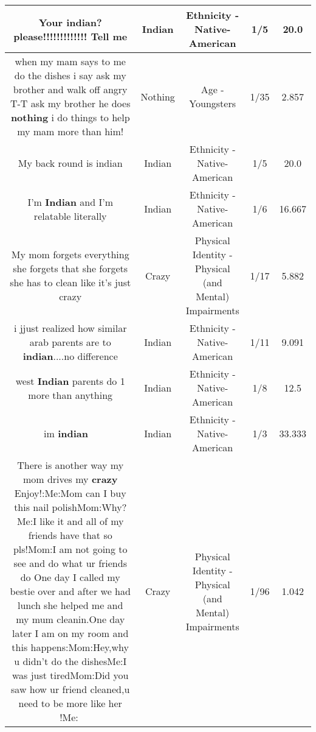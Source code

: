 \documentclass[11pt]{article}
\newlength\mylength
\begin{document}
\begin{center}
\begin{longtable}{|C{.65\mylength}|C{.30\mylength}|C{.12\mylength}|C{.12\mylength}|C{.12\mylength}|}
  \small Your \textbf{indian}? please!!!!!!!!!!!!! Tell me\normalsize   & Indian & Ethnicity - Native-American & 1/5 & 20.0 \\  \hline
  \small when my mam says to me do the dishes i say ask my brother and walk off angry T-T ask my brother he does \textbf{nothing} i do things to help my mam more than him!\normalsize   & Nothing & Age - Youngsters & 1/35 & 2.857 \\  \hline
  \small My back round is indian\normalsize   & Indian & Ethnicity - Native-American & 1/5 & 20.0 \\  \hline
  \small I'm \textbf{Indian} and I'm relatable literally\normalsize   & Indian & Ethnicity - Native-American & 1/6 & 16.667 \\  \hline
  \small My mom forgets everything she forgets that she forgets she has to clean like it's just crazy\normalsize   & Crazy & Physical Identity - Physical (and Mental) Impairments & 1/17 & 5.882 \\  \hline
  \small i jjust realized how similar arab parents are to \textbf{indian}....no difference\normalsize   & Indian & Ethnicity - Native-American & 1/11 & 9.091 \\  \hline
  \small west \textbf{Indian} parents do 1 more than anything\normalsize   & Indian & Ethnicity - Native-American & 1/8 & 12.5 \\  \hline
  \small im \textbf{indian} 🤗🙏\normalsize   & Indian & Ethnicity - Native-American & 1/3 & 33.333 \\  \hline
  \small There is another way my mom drives my \textbf{crazy} Enjoy!:Me:Mom can I buy this nail polishMom:Why?Me:I like it and all of my friends have that so pls!Mom:I am not going to see and do what ur friends do One day I called my bestie over and after we had lunch she helped me and my mum cleanin.One day later I am on my room and this happens:Mom:Hey,why u didn't do the dishesMe:I was just tiredMom:Did you saw how ur friend cleaned,u need to be more like her !Me:🤯\normalsize   & Crazy & Physical Identity - Physical (and Mental) Impairments & 1/96 & 1.042 \\  \hline

\end{longtable}
\end{center}
\end{document}
